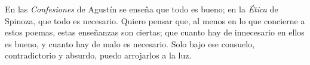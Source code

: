 
En las \textit{Confesiones} de Agustín se enseña que todo es bueno; en la
\textit{Ética} de Spinoza, que todo es necesario. Quiero pensar que, al menos
en lo que concierne a estos poemas, estas enseñanzas son ciertas; que cuanto
hay de innecesario en ellos es bueno, y cuanto hay de malo es necesario. Solo 
bajo ese consuelo, contradictorio y absurdo, puedo arrojarlos a la luz.

